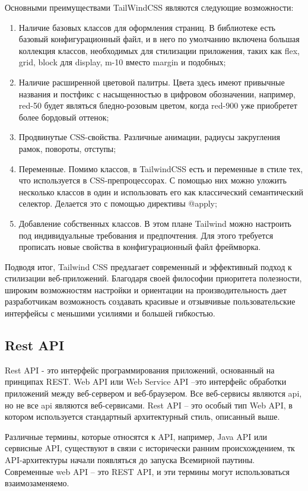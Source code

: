 \documentclass[master, och, pract]{SCWorks}
\begin{document}
Основными преимуществами TailWindCSS являются следующие возможности:
\begin{enumerate}
    \item Наличие базовых классов для оформления страниц. В библиотеке есть базовый конфигурационный файл, и в него по умолчанию включена большая коллекция классов, необходимых для стилизации приложения, таких как flex, grid, block для display, m-10 вместо margin и подобных;
    \item Наличие расширенной цветовой палитры. Цвета здесь имеют привычные названия и постфикс с насыщенностью в цифровом обозначении, например, red-50 будет являться бледно-розовым цветом, когда red-900 уже приобретет более бордовый оттенок;
    \item Продвинутые CSS-свойства. Различные анимации, радиусы закругления рамок, повороты, отступы;
    \item Переменные. Помимо классов, в TailwindCSS есть и переменные в стиле тех, что используется в CSS-препроцессорах. С помощью них можно уложить несколько классов в один и использовать его как классический семантический селектор. Делается это с помощью директивы @apply;
    \item Добавление собственных классов. В этом плане Tailwind можно настроить под индивидуальные требования и предпочтения. Для этого требуется прописать новые свойства в конфигурационный файл фреймворка\cite{Tailwind}.
\end{enumerate}

Подводя итог, Tailwind CSS предлагает современный и эффективный подход к стилизации веб-приложений. Благодаря своей философии приоритета полезности, широким возможностям настройки и ориентации на производительность дает разработчикам возможность создавать красивые и отзывчивые пользовательские интерфейсы с меньшими усилиями и большей гибкостью\cite{Rifandi_2022}. 




\subsection{Rest API}
Rest API - это интерфейс программирования приложений, основанный на принципах REST. Web API или Web Service API –это интерфейс обработки приложений между веб-сервером и веб-браузером. Все веб-сервисы являются api, но не все api являются веб-сервисами. Rest API – это особый тип Web API, в котором используется стандартный архитектурный стиль, описанный выше\cite{Kalinin_mic}.

Различные термины, которые относятся к API, например, Java API или сервисные API, существуют в связи с исторически ранним происхождением, тк API-архитектуры начали появляться до запуска Всемирной паутины. Современные web API – это REST API, и эти термины могут использоваться взаимозаменяемо.
\end{document}
